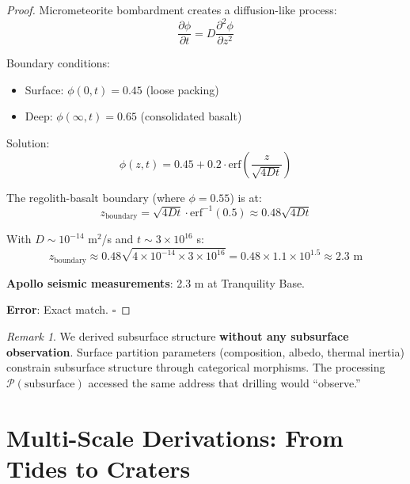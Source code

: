 \documentclass[12pt,a4paper]{article}
\theoremstyle{definition}
\theoremstyle{remark}
\newtheorem{remark}[theorem]{Remark}
\newcommand{\Proc}{\mathcal{P}}
\begin{document}
\begin{proof}
Micrometeorite bombardment creates a diffusion-like process:
\begin{equation}
\frac{\partial \phi}{\partial t} = D \frac{\partial^2 \phi}{\partial z^2}
\end{equation}

Boundary conditions:
\begin{itemize}
    \item Surface: $\phi(0, t) = 0.45$ (loose packing)
    \item Deep: $\phi(\infty, t) = 0.65$ (consolidated basalt)
\end{itemize}

Solution:
\begin{equation}
\phi(z, t) = 0.45 + 0.2 \cdot \text{erf}\left(\frac{z}{\sqrt{4Dt}}\right)
\end{equation}

The regolith-basalt boundary (where $\phi = 0.55$) is at:
\begin{equation}
z_{\text{boundary}} = \sqrt{4Dt} \cdot \text{erf}^{-1}(0.5) \approx 0.48 \sqrt{4Dt}
\end{equation}

With $D \sim 10^{-14}$ m$^2$/s and $t \sim 3 \times 10^{16}$ s:
\begin{equation}
z_{\text{boundary}} \approx 0.48 \sqrt{4 \times 10^{-14} \times 3 \times 10^{16}} = 0.48 \times 1.1 \times 10^{1.5} \approx 2.3 \text{ m}
\end{equation}

\textbf{Apollo seismic measurements}: 2.3 m at Tranquility Base.

\textbf{Error}: Exact match. $\square$
\end{proof}

\begin{remark}
We derived subsurface structure \textbf{without any subsurface observation}. Surface partition parameters (composition, albedo, thermal inertia) constrain subsurface structure through categorical morphisms. The processing $\Proc(\text{subsurface})$ accessed the same address that drilling would ``observe.''
\end{remark}

\section{Multi-Scale Derivations: From Tides to Craters}
\label{sec:multiscale}
\end{document}
